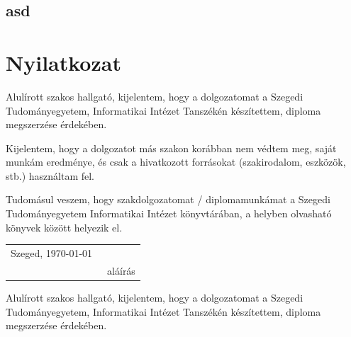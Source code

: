 \documentclass[12pt]{report}
\theoremstyle{definition}
\begin{document}
\section{asd}



\chapter*{Nyilatkozat}




\noindent
Alulírott \makebox[4cm]{\dotfill} szakos hallgató, kijelentem, hogy a dolgozatomat a Szegedi Tudományegyetem, Informatikai Intézet \makebox[4cm]{\dotfill} Tanszékén készítettem, \makebox[4cm]{\dotfill} diploma megszerzése érdekében.

Kijelentem, hogy a dolgozatot más szakon korábban nem védtem meg, saját munkám eredménye, és csak a hivatkozott forrásokat (szakirodalom, eszközök, stb.) használtam fel.

Tudomásul veszem, hogy szakdolgozatomat / diplomamunkámat a Szegedi Tudományegyetem Informatikai Intézet könyvtárában, a helyben olvasható könyvek között helyezik el.

\vspace*{2cm}

\begin{tabular}{lc}
	Szeged, \today\
	\hspace{2cm} & \makebox[6cm]{\dotfill} \\
	             & aláírás                 \\
\end{tabular}


\vspace*{4cm}


\noindent
Alulírott \makebox[4cm]{\dotfill} szakos hallgató, kijelentem, hogy a dolgozatomat a Szegedi Tudományegyetem, Informatikai Intézet \makebox[4cm]{\dotfill} Tanszékén készítettem, \makebox[4cm]{\dotfill} diploma megszerzése érdekében.
\end{document}
